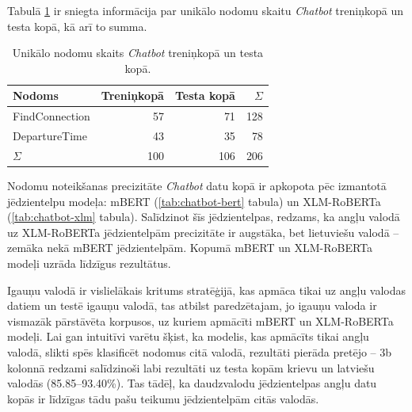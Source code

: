 Tabulā \ref{tab:chatbot-labels} ir sniegta informācija par unikālo nodomu skaitu  \textit{Chatbot} treniņkopā un testa kopā, kā arī to summa.

\begin{table}[htbp]
  \centering
  \caption{Unikālo nodomu skaits \textit{Chatbot} treniņkopā un testa kopā.}
    \begin{tabular}{lrrr} \toprule
    Nodoms & Treniņkopā & Testa kopā & $\Sigma$ \\\midrule
    FindConnection & 57    & 71 & 128 \\
    DepartureTime & 43    & 35 & 78 \\
    $\Sigma$ & 100    & 106 & 206 \\\bottomrule
    \end{tabular}%
  \label{tab:chatbot-labels}%
\end{table}%


Nodomu noteikšanas precizitāte \textit{Chatbot} datu kopā ir apkopota pēc izmantotā jēdzientelpu modeļa: mBERT (\ref{tab:chatbot-bert} tabula) un XLM-RoBERTa (\ref{tab:chatbot-xlm} tabula). Salīdzinot šīs jēdzientelpas, redzams, ka angļu valodā uz XLM-RoBERTa jēdzientelpām precizitāte ir augstāka, bet lietuviešu valodā -- zemāka nekā mBERT jēdzientelpām. Kopumā mBERT un XLM-RoBERTa modeļi uzrāda līdzīgus rezultātus.


Igauņu valodā ir vislielākais kritums stratēģijā, kas apmāca tikai uz angļu valodas datiem un testē igauņu valodā, tas atbilst paredzētajam, jo igauņu valoda ir vismazāk pārstāvēta korpusos, uz kuriem apmācīti mBERT un XLM-RoBERTa modeļi. Lai gan intuitīvi varētu šķist, ka modelis, kas apmācīts tikai angļu valodā, slikti spēs klasificēt nodomus citā valodā, rezultāti pierāda pretējo -- 3b kolonnā redzami salīdzinoši labi rezultāti uz testa kopām krievu un latviešu valodās (85.85--93.40\%). Tas tādēļ, ka daudzvalodu jēdzientelpas angļu datu kopās ir līdzīgas tādu pašu teikumu jēdzientelpām citās valodās.




